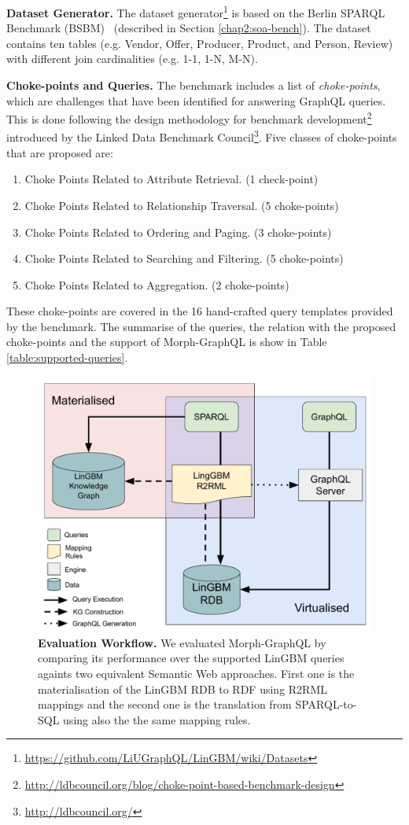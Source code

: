 \textbf{Dataset Generator.}
The dataset generator\footnote{\url{https://github.com/LiUGraphQL/LinGBM/wiki/Datasets}} is based on the Berlin SPARQL Benchmark (BSBM)~\citep{bizer2009berlin} (described in Section \ref{chap2:soa-bench}). The dataset contains ten tables (e.g.  Vendor, Offer, Producer, Product, and Person, Review) with different join cardinalities (e.g. 1-1, 1-N, M-N).

\textbf{Choke-points and Queries.} 
The benchmark includes a list of \textit{choke-points}, which are challenges that have been identified for answering GraphQL queries. This is done following the design methodology for benchmark development\footnote{\url{http://ldbcouncil.org/blog/choke-point-based-benchmark-design}} introduced by the Linked Data Benchmark Council\footnote{\url{http://ldbcouncil.org/}}. Five classes of choke-points that are proposed are: 
\begin{enumerate}
    \item Choke Points Related to Attribute Retrieval. (1 check-point)
    \item Choke Points Related to Relationship Traversal. (5 choke-points)
    \item Choke Points Related to Ordering and Paging. (3 choke-points)
    \item Choke Points Related to Searching and Filtering. (5 choke-points)
    \item Choke Points Related to Aggregation. (2 choke-points)
\end{enumerate}

These choke-points are covered in the 16 hand-crafted query templates provided by the benchmark. The summarise of the queries, the relation with the proposed choke-points and the support of Morph-GraphQL is show in Table \ref{table:supported-queries}.


\begin{figure}[ht]
    \centering
    \includegraphics[width=.8\linewidth]{figures/evaluation.pdf}
    \caption[Morph-GraphQL evaluation workflow.]{\textbf{Evaluation Workflow.} We evaluated Morph-GraphQL by comparing its performance over the supported LinGBM queries againts two equivalent Semantic Web approaches. First one is the materialisation of the LinGBM RDB to RDF using R2RML mappings and the second one is the translation from SPARQL-to-SQL using also the the same mapping rules.}
    \label{fig:eval-workflow}
\end{figure}

